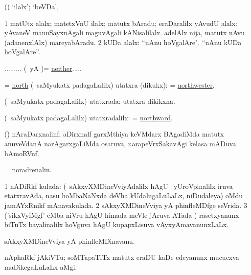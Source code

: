 \bentry
{}
\gl{\kirxvi}
\bmng
(\AmA) `ilalx'; `beVDa', 
\emng
\eentry

\bentry
{}
\gl{\saMavayx}
\bmng
\bnum
\num{1} matUtx alalx; matetxVnU ilalx; matutx bAradu; eraDaralilx yAvudU alalx:  yAvaneV manuSayxnAgali maguvAgali kANisalilalx.  adelAlx nija, matutx nAvu (adanenxlAlx) mareyabAradu. 
\num{2} kUDa alalx:  ``nAnu hoVgalAre", ``nAnu kUDa hoVgalAre''. 
\enum
\emng

\noindent
\gl{\pagu}
\bmng
{}......... (\kAparx\ yA \pArxparx)= \hyperlink{neither(1)}{neither}..... 
\emng
\eentry

\bentry
{}
\gl{\nA}
\bmng
 = \hyperlink{north(1)}{north} (\kanmu\ saMyukatx padagaLalilx) utatxra (dikukx):  = \hyperlink{northwester}{northwester}. 
\emng
\eentry

\bentry
{}
\gl{\gu}
\bmng
(\kanmu\ saMyukatx padagaLalilx) utatxrada: utatxra dikikxna. 
\emng
\eentry

\bentry
{}
\gl{\kirxvi}
\bmng
(\kanmu\ saMyukatx padagaLalilx) utatxradalilx:  = \hyperlink{northward(1)}{northward}. 
\emng
\eentry

\bentry
{}
\gl{\nA}
\bmng
(\jiVra) nAraDarxnalinf; aDirxnalf garxMthiya keVMdarx BAgadiMda matutx anuveVdanA narAgarxgaLiMda osaruva, narapeVrxSakavAgi kelasa mADuva hAmoRVnf. 
\emng
\eentry

\bentry
{}
\gl{\nA}
\bmng
= \hyperlink{noradrenalin}{noradrenalin}. 
\emng
\eentry

\bentry
{}
\gl{\gu}
\bmng
\bnum
\num{1} nADiRkf kulada: (\kanmu\ sAkxyXMDineVviyAdalilx hAgU \kanu\ yUroVpinalilx iruva etatxravAda, nasu hoMbaNaNxda deVha kUdalugaLuLaLx, niDudaleya) oMdu jamAYxRnikf mAnavakulada. 
\num{2} sAkxyXMDineVviya yA phinfleMDfge seVrida. 
\num{3} ('sikxVyiMgf' eMba niVru hAgU himada meVle jAruva ATada \vi) rasetxyanunx biTuTx bayalinalilx hoVguva hAgU kupapxLisuva vAyxyAmavanunxLaLx. 
\enum
\emng
\eentry

\bentry
{}
\gl{\nA}
\bmng
sAkxyXMDineVviya yA phinfleMDinavanu. 
\emng
\eentry

\bentry
{}
\gl{\nA}
\bmng
nAphaRkf jAkiVTu; soMTapaTiTx matutx eraDU kaDe edeyanunx mucucxva maDikegaLuLaLx aMgi.  
\emng
\eentry

